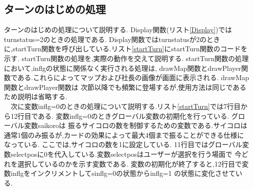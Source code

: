 \documentclass[a4j]{jarticle}
\begin{document}
    \subsection{ターンのはじめの処理}
    ターンのはじめの処理について説明する.     
    Display関数(リスト\ref{Display})ではturnstatus=2のときの処理である.
    Display関数ではturnstatusが2のときに,startTurn関数を呼び出している.リスト\ref{startTurn}にstartTurn関数のコードを示す.
    startTurn関数の処理を,実際の動作を交えて説明する. startTurn関数の処理において,inflgの状態に関係なく実行される処理は,
    drawMap関数とdrawPlayer関数である.これらによってマップおよび社長の画像が画面に表示される. drawMap関数とdrawPlayer関数は
    次節以降でも頻繁に登場するが,使用方法は同じであるため説明は省略する.\\
    　次に変数inflg=0のときの処理について説明する.リスト\ref{startTurn}では7行目から12行目である.
    変数inflg=0のときグローバル変数の初期化を行っている. グローバル変数saikoroは
    振るサイコロの数を制御するための変数である.サイコロは通常1個のみ振るが,カードの効果によって最大4個まで振ることができる仕様になっている.
    ここでは,サイコロの数を1に設定している. 11行目ではグローバル変数selectposに0を代入している.変数selectposはユーザーが選択を行う場面で
    今どれを選択しているのかを示す変数である. 変数の初期化が終了すると,12行目で変数inflgをインクリメントしてsinflg=0の状態からinflg=1
    の状態に変化させている.\\
\end{document}
